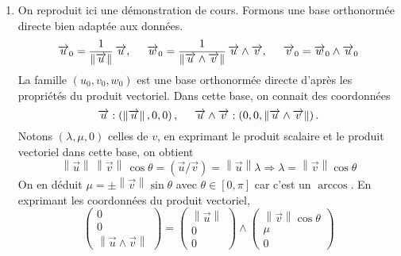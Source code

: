 \begin{enumerate}
 \item On reproduit ici une démonstration de cours. Formons une base orthonormée directe bien adaptée aux données.
 \begin{displaymath}
  \overrightarrow u_0 = \frac{1}{\left\|\overrightarrow u\right\|}\,\overrightarrow u, \hspace{0.5cm}
  \overrightarrow w_0 = \frac{1}{\left\| \overrightarrow u\wedge \overrightarrow v\right\|}\, \overrightarrow u \wedge \overrightarrow v,\hspace{0.5cm}
  \overrightarrow v_0 = \overrightarrow w_0 \wedge \overrightarrow u_0
 \end{displaymath}
La famille $\left( u_0, v_0, w_0\right)$ est une base orthonormée directe d'après les propriétés du produit vectoriel. Dans cette base, on connait des coordonnées 
\begin{displaymath}
 \overrightarrow u : \left( \left\| \overrightarrow u \right\|, 0 , 0\right),\hspace{0.5cm}
 \overrightarrow u \wedge \overrightarrow v : \left( 0, 0, \left\|\overrightarrow u \wedge \overrightarrow v \right\|\right). 
\end{displaymath}
Notons $(\lambda, \mu, 0)$ celles de $v$, en exprimant le produit scalaire et le produit vectoriel dans cette base, on obtient
\begin{displaymath}
\left\|\overrightarrow u\right\|\,\left\|\overrightarrow v\right\|\,\cos \theta 
= (\overrightarrow u /  \overrightarrow v)
= \left\|\overrightarrow u\right\| \lambda
\Rightarrow \lambda = \left\|\overrightarrow v\right\| \cos \theta
\end{displaymath}
On en déduit $\mu = \pm \left\|\overrightarrow v\right\| \sin \theta$ avec $\theta \in [0, \pi]$ car c'est un $\arccos$. En exprimant les coordonnées du produit vectoriel,
\begin{displaymath}
\begin{pmatrix}
 0 \\ 0 \\ \left\| \overrightarrow u \wedge \overrightarrow v \right\|
\end{pmatrix}
=
 \begin{pmatrix}
  \left\|\overrightarrow u\right\| \\ 0 \\ 0
 \end{pmatrix}
\wedge
\begin{pmatrix}
 \left\|\overrightarrow v\right\| \cos \theta \\ \mu \\ 0

\end{pmatrix}
\end{displaymath}
\end{enumerate}
